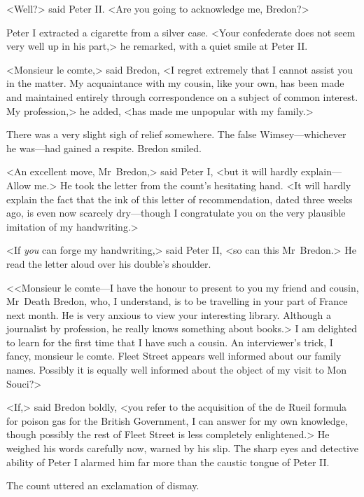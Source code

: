 <Well?> said Peter II. <Are you going to acknowledge me, Bredon?>

Peter I extracted a cigarette from a silver case. <Your confederate does not seem very well up in his part,> he remarked, with a quiet smile at Peter II.

<Monsieur le comte,> said Bredon, <I regret extremely that I cannot assist you in the matter. My acquaintance with my cousin, like your own, has been made and maintained entirely through correspondence on a subject of common interest. My profession,> he added, <has made me unpopular with my family.>

There was a very slight sigh of relief somewhere. The false Wimsey—whichever he was—had gained a respite. Bredon smiled.

<An excellent move, Mr~Bredon,> said Peter I, <but it will hardly explain—Allow me.> He took the letter from the count's hesitating hand. <It will hardly explain the fact that the ink of this letter of recommendation, dated three weeks ago, is even now scarcely dry—though I congratulate you on the very plausible imitation of my handwriting.>

<If \textit{you} can forge my handwriting,> said Peter II, <so can this Mr~Bredon.> He read the letter aloud over his double's shoulder.

<<Monsieur le comte—I have the honour to present to you my friend and cousin, Mr~Death Bredon, who, I understand, is to be travelling in your part of France next month. He is very anxious to view your interesting library. Although a journalist by profession, he really knows something about books.> I am delighted to learn for the first time that I have such a cousin. An interviewer's trick, I fancy, monsieur le comte. Fleet Street appears well informed about our family names. Possibly it is equally well informed about the object of my visit to Mon Souci?>

<If,> said Bredon boldly, <you refer to the acquisition of the de Rueil formula for poison gas for the British Government, I can answer for my own knowledge, though possibly the rest of Fleet Street is less completely enlightened.> He weighed his words carefully now, warned by his slip. The sharp eyes and detective ability of Peter I alarmed him far more than the caustic tongue of Peter II.

The count uttered an exclamation of dismay.

